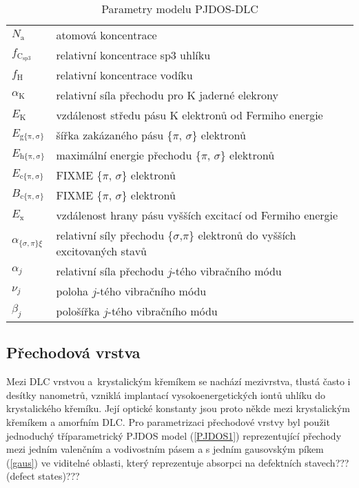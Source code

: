 \begin{table}
\centering
\begin{tabular}{l l}
\hline

$N_\mathrm{a}$ & atomová koncentrace \\
$f_\mathrm{C_{sp3}}$ & relativní koncentrace sp3 uhlíku \\
$f_\mathrm{H}$ & relativní koncentrace vodíku \\

$\alpha_\mathrm{K}$ & relativní síla přechodu pro K jaderné elekrony\\
$E_\mathrm{K}$ & vzdálenost středu pásu K elektronů od Fermiho energie\\

$E_\mathrm{g\{\pi,\sigma\}}$ & šířka zakázaného pásu \{$\pi$, $\sigma$\} elektronů\\
$E_\mathrm{h\{\pi,\sigma\}}$ & maximální energie přechodu \{$\pi$, $\sigma$\} elektronů\\
$E_\mathrm{c\{\pi,\sigma\}}$ & FIXME \{$\pi$, $\sigma$\} elektronů\\
$B_\mathrm{c\{\pi,\sigma\}}$ & FIXME \{$\pi$, $\sigma$\} elektronů\\

$E_\mathrm{x}$ & vzdálenost hrany pásu vyšších excitací od Fermiho energie\\
$\alpha_{\{\sigma,\pi\}\xi}$ & relativní síly přechodu \{$\sigma$,$\pi$\} elektronů do vyšších excitovaných stavů \\

$\alpha_j$ & relativní síla přechodu $j$-tého vibračního módu \\
$\nu_j$ & poloha $j$-tého vibračního módu\\
$\beta_j$ & pološířka $j$-tého vibračního módu\\
\hline

\end{tabular}
\label{DLCparametry}
\caption{Parametry modelu PJDOS-DLC}
\end{table}

\subsection{Přechodová vrstva}
Mezi DLC vrstvou a~krystalickým křemíkem se nachází mezivrstva, tlustá často i desítky nanometrů, vzniklá implantací vysokoenergetických iontů uhlíku do krystalického křemíku. Její optické konstanty jsou proto někde mezi krystalickým křemíkem a amorfním DLC. Pro parametrizaci přechodové vrstvy byl použit jednoduchý tříparametrický PJDOS model (\ref{PJDOS1}) reprezentující přechody mezi jedním valenčním a vodivostním pásem a s jedním gausovským píkem (\ref{gaus}) ve viditelné oblasti, který reprezentuje absorpci na defektních stavech??? (defect states)???

